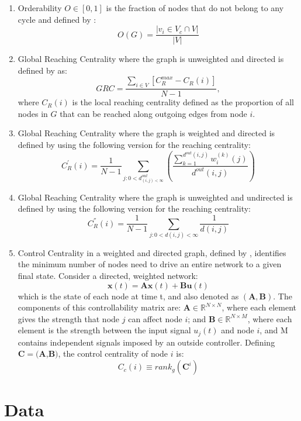\documentclass[3p,times]{elsarticle}
\begin{document}
\begin{enumerate}
	\item Orderability $O\in[0,1]$ is the fraction of nodes that do not belong to any cycle and defined by \cite{3D}:
	$$
	O(G)=\frac{|v_i\in V_c\cap V|}{|V|}
	$$
	
	\item Global Reaching Centrality where the graph is unweighted and directed is defined by \cite{GRC} as:
	$$
	GRC=\frac{\sum_{i\in V}{[C_R^{max}-C_R(i)]}}{N-1},
	$$
	where $C_R(i)$ is the local reaching centrality defined as the proportion of all nodes in $G$ that can be reached along outgoing edges from node $i$.
	
	\item Global Reaching Centrality where the graph is weighted and directed is defined by \cite{GRC} using the following version for the reaching centrality:
	$$
	C_{R}^{'}(i)=\frac{1}{N-1}\sum_{j: 0<d^{out}_{(i,j)<\infty}}{( \frac{\sum_{k=1}^{d^{out}(i,j)} {w_{i}^{(k)} (j) } }{d^{out}(i,j)} )}
	$$
	
	\item Global Reaching Centrality where the graph is unweighted and undirected is defined by \cite{GRC} using the following version for the reaching centrality:
	$$
	C_{R}^{''}(i)=\frac{1}{N-1}\sum_{j:0<d(i,j)<\infty}{\frac{1}{d(i,j)}}
	$$
	
	\item Control Centrality in a weighted and directed graph, defined by \cite{Liu12}, identifies the minimum number of nodes need to drive an entire network to a given final state. Consider a directed, weighted network:
	$$
	\bm{x}(t) = \bm{Ax}(t) + \bm{Bu}(t)
	$$
	which is the state of each node at time t, and also denoted as \begin{math}(\bm{A},\bm{B})\end{math}. The components of this controllability matrix are: $\bm{A}\in \mathbb{R}^{N\times N}$, where each element gives the strength that node $j$ can affect node $i$; and $\bm{B}\in\mathbb{R}^{N\times M}$, where each element is the strength between the input signal $u_{j}(t)$ and node $i$, and M contains independent signals imposed by an outside controller. Defining $\bm{C} = (\bm{A}$,$\bm{B})$, the control centrality of node $i$ is:
	$$
	C_{c}(i) \equiv rank_{g}(\bm{C}^{i})
	$$
\end{enumerate}

\section{Data}
\end{document}
